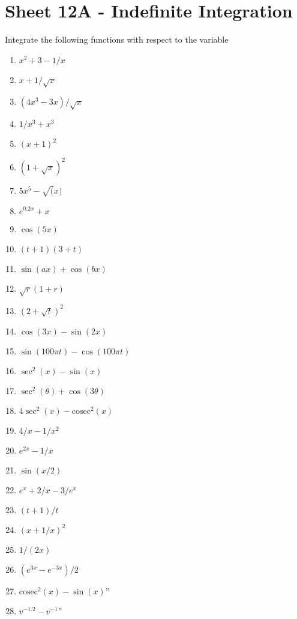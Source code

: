 \documentclass[
  11pt,
  oneside]{book}
\providecommand{\tightlist}{%
  \setlength{\itemsep}{0pt}\setlength{\parskip}{0pt}}
\theoremstyle{definition}
\theoremstyle{definition}
\theoremstyle{definition}
\theoremstyle{definition}
\theoremstyle{remark}
\begin{document}
\section{Sheet 12A - Indefinite Integration}\label{sheet-12a---indefinite-integration}

Integrate the following functions with respect to the variable

\begin{enumerate}
\def\labelenumi{\arabic{enumi}.}
\tightlist
\item
  \(x^2+3-1/x\)
\item
  \(x+1/\sqrt{x}\)
\item
  \((4x^3-3x)/\sqrt{x}\)
\item
  \(1/x^3+x^3\)
\item
  \((x+1)^2\)
\item
  \((1+\sqrt{x})^2\)
\item
  \(5x^5-\sqrt(x)\)
\item
  \(e^{0.2x}+x\)
\item
  \(\cos(5x)\)
\item
  \((t+1)(3+t)\)
\item
  \(\sin(ax)+\cos(bx)\)
\item
  \(\sqrt{r}(1+r)\)
\item
  \((2+\sqrt{t})^2\)
\item
  \(\cos(3x)-\sin(2x)\)
\item
  \(\sin(100\pi t)-\cos(100\pi t)\)
\item
  \(\sec^2(x)-\sin(x)\)
\item
  \(\sec^2(\theta)+\cos(3\theta)\)
\item
  \(4\sec^2(x)-\text{cosec}^2(x)\)
\item
  \(4/x-1/x^2\)
\item
  \(e^{2x}-1/x\)
\item
  \(\sin(x/2)\)
\item
  \(e^x+2/x-3/e^x\)
\item
  \((t+1)/t\)
\item
  \((x+1/x)^2\)
\item
  \(1/(2x)\)
\item
  \((e^{3x}-e^{-3x})/2\)
\item
  \(\text{cosec}^2(x)-\sin(x)\)''
\item
  \(v^{-1.2}-v^{-1}\)''
\end{enumerate}
\end{document}
